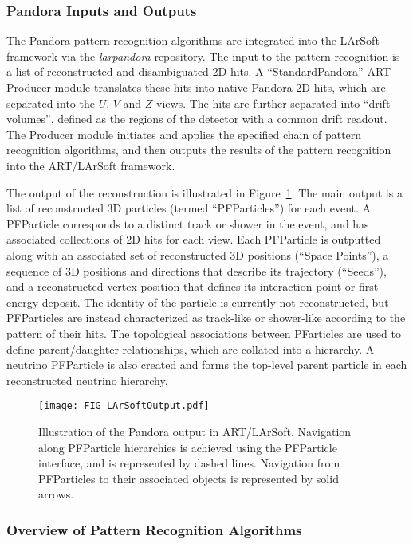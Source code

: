 \subsubsection{Pandora Inputs and Outputs}

The Pandora pattern recognition algorithms are integrated into the LArSoft framework via the {\it larpandora} repository. The input to the pattern recognition is a list of reconstructed and disambiguated 2D hits. A ``StandardPandora'' ART Producer module translates these hits into native Pandora 2D hits, which are separated into the $U$, $V$ and $Z$ views. The hits are further separated into ``drift volumes'', defined as the regions of the detector with a common drift readout. The Producer module initiates and applies the specified chain of pattern recognition algorithms, and then outputs the results of the pattern recognition into the ART/LArSoft framework.

The output of the reconstruction is illustrated in Figure~\ref{larsoft_output}. The main output is a list of reconstructed 3D particles (termed ``PFParticles'') for each event. A PFParticle corresponds to a distinct track or shower in the event, and has associated collections of 2D hits for each view. Each PFParticle is outputted along with an associated set of reconstructed 3D positions (``Space Points''), a sequence of 3D positions and directions that describe its trajectory (``Seeds''), and a reconstructed vertex position that defines its interaction point or first energy deposit. The identity of the particle is currently not reconstructed, but PFParticles are instead characterized as track-like or shower-like according to the pattern of their hits. The topological associations between PFarticles are used to define parent/daughter relationships, which are collated into a hierarchy. A neutrino PFParticle is also created and forms the top-level parent particle in each reconstructed neutrino hierarchy.

\begin{figure}[!h!tbp]
\centering
\texttt{[image: FIG\_LArSoftOutput.pdf]}
\caption{Illustration of the Pandora output in ART/LArSoft. Navigation along PFParticle hierarchies is achieved using the PFParticle interface, and is represented by dashed lines. Navigation from PFParticles to their associated objects is represented by solid arrows. }
\label{larsoft_output}
\end{figure}

\subsubsection{Overview of Pattern Recognition Algorithms}

